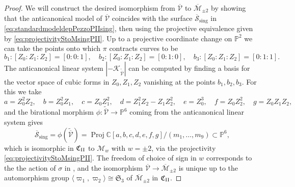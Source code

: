 \documentclass[a4paper,reqno]{amsart}
\numberwithin{equation}{section}
\newcommand{\C}{\mathbb{C}}
\newcommand{\p}{\mathbb{P}}
\DeclareMathOperator{\Proj}{Proj}
\numberwithin{equation}{section}
\begin{document}
\begin{proof}
    We will construct the desired isomorphism from $\overline{\mathcal{V}}$ to $\overline{\mathcal{M}}_{\pm 2}$ by showing that the anticanonical model of $\overline{\mathcal{V}}$ coincides with the surface $\overline{\mathcal{S}}_{\operatorname{sing}}$ in \eqref{eq:standardmodeldepPezzoPIIsing}, then using the projective equivalence given by \eqref{eq:projectivityStoMsingPII}.
    Up to a projective coordinate change on $\p^2$ we can take the points onto which $\pi$ contracts curves to be 
    \begin{equation*}
    b_1 : [Z_0:Z_1:Z_2] =[0:0:1] , \quad 
    b_2 :[Z_0:Z_1:Z_2] =[0:1:0], \quad 
    b_3 : [Z_0:Z_1:Z_2]=[0:1:1].
      \end{equation*}
The anticanonical linear system $|-\mathcal{K}_{\widetilde{\overline{\mathcal{V}}}}|$ can be computed by finding a basis for the vector space of cubic forms in $Z_0,Z_1,Z_2$ vanishing at the points $b_1,b_2,b_3$. 
    For this we take  
        \begin{equation*} a = Z_0^2 Z_2,\quad 
    b = Z_0^2 Z_1,\quad 
    c = Z_0 Z_1^2, \quad 
    d = Z_1^2 Z_2 - Z_1 Z_2^2, \quad
    e = Z_0^3, \quad 
    f = Z_0 Z_2^2, \quad 
    g = Z_0 Z_1 Z_2,\end{equation*}
    and the birational morphism $\phi  : \widetilde{\overline{\mathcal{V}}} \to \p^6$ coming from the anticanonical linear system gives 
        \begin{equation*} 
        \overline{\mathcal{S}}_{\operatorname{sing}} = \phi (\widetilde{\overline{\mathcal{V}}})=\Proj \C[a,b,c,d,e,f,g] / (m_1,\dots,m_9)\subset \p^6,
    \end{equation*}
    which is isomorphic in $\mathfrak{C}_{\rm{II}}$ to $\mathcal{M}_w$ with $w=\pm 2$, via the projectivity \eqref{eq:projectivityStoMsingPII}.
    The freedom of choice of sign in $w$ corresponds to the the action of $\sigma$ in , and the isomorphism $\overline{\mathcal{V}}\to \overline{\mathcal{M}}_{\pm 2}$ is unique up to the automorphism group $\langle \varpi_1, \varpi_2\rangle \cong \mathfrak{S}_3$ of $\overline{\mathcal{M}}_{\pm 2}$ in $\mathfrak{C}_{\rm{II}}$.
    \end{proof}
\end{document}
